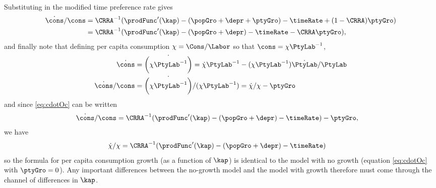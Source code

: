 \documentclass{handout}
\begin{document}
Substituting in the modified time preference rate gives
\begin{equation}\begin{gathered}\begin{aligned}
  \dot{\cons}/\cons  & =  \CRRA^{-1}(\prodFunc^{\prime}(\kap)-(\popGro+\depr+\ptyGro)-\timeRate  +(1- \CRRA) \ptyGro)
  \\   & =  \CRRA^{-1}(\prodFunc^{\prime}(\kap)-(\popGro+\depr)-\timeRate  - \CRRA \ptyGro), \label{eq:cdotOc}
\end{aligned}\end{gathered}\end{equation}
and finally note that defining per capita consumption $\chi = \Cons/\Labor$
so that $\cons = \chi \PtyLab ^{-1}$, 
\begin{equation}\begin{gathered}\begin{aligned}
  \label{eq:chiDotOchi}
  \dot{\cons} & =  \dot{\biggl(\chi \PtyLab ^{-1}\biggr)} =  \dot{\chi}\PtyLab ^{-1}-(\chi \PtyLab ^{-1})\dot{\PtyLab }/\PtyLab 
  \\ \dot{\cons}/\cons & =  \dot{\biggl(\chi \PtyLab ^{-1}\biggr)}/(\chi \PtyLab^{-1}) =  \dot{\chi}/\chi - \ptyGro 
\end{aligned}\end{gathered}\end{equation}
and since \eqref{eq:cdotOc} can be written
\begin{equation}\begin{gathered}\begin{aligned}
  \dot{\cons}/\cons  & =  \CRRA^{-1}(\prodFunc^{\prime}(\kap)-(\popGro+\depr)-\timeRate ) - \ptyGro,
\end{aligned}\end{gathered}\end{equation}
we have
\begin{equation}\begin{gathered}\begin{aligned}
  \dot{\chi}/\chi & =  \CRRA^{-1}(\prodFunc^{\prime}(\kap)-(\popGro+\depr)-\timeRate )
\end{aligned}\end{gathered}\end{equation}
so the formula for per capita consumption growth (as a function of
$\kap$) is identical to the model with no growth (equation
\eqref{eq:cdotOc} with $\ptyGro=0$).  Any important differences between
the no-growth model and the model with growth therefore must come
through the channel of differences in $\kap$.
\end{document}
